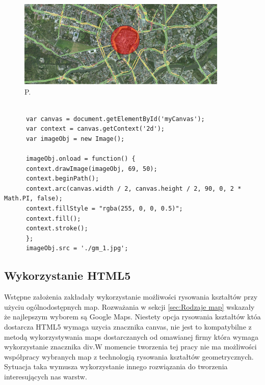   \begin{figure}[H]
  \centering
    \includegraphics[width=100mm]{ge/canvas1.jpg}
  \caption{P.}
  \label{fig:canvas1}
\end{figure}

\lstset{language=JavaScript}
\begin{lstlisting}[caption=json]

      var canvas = document.getElementById('myCanvas');
      var context = canvas.getContext('2d');
      var imageObj = new Image();
	
      imageObj.onload = function() {
      context.drawImage(imageObj, 69, 50);
	  context.beginPath();
      context.arc(canvas.width / 2, canvas.height / 2, 90, 0, 2 * Math.PI, false);
      context.fillStyle = "rgba(255, 0, 0, 0.5)";
      context.fill();
      context.stroke();
      };
      imageObj.src = './gm_1.jpg';

\end{lstlisting}

\subsection{Wykorzystanie HTML5}
\label{subsec:htmluse}

Wstępne założenia zakładały wykorzystanie możliwości rysowania kształtów przy użyciu ogólnodostępnych map. Rozważania w sekcji \ref{sec:Rodzaje map} wskazały że najlepszym wyborem są Google Maps. Niestety opcja rysowania kształtów któa dostarcza HTML5 wymaga uzycia znacznika canvas, nie jest to kompatybilne z metodą wykorzystywania maps dostarczanych od omawianej firmy która wymaga wykorzystanie znacznika div.W momencie tworzenia tej pracy nie ma możliwości współpracy wybranych map z technologią rysowania kształtów geometrycznych. Sytuacja taka wymusza wykorzystanie innego rozwiązania do tworzenia interesujących nas warstw.

